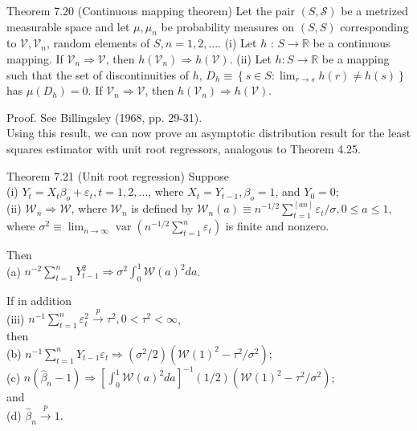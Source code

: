 \documentclass[10pt]{article}
\begin{document}
Theorem 7.20 (Continuous mapping theorem) Let the pair $(S, \mathcal{S})$ be a metrized measurable space and let $\mu, \mu_{n}$ be probability measures on $(S, S)$ corresponding to $\mathcal{V}, \mathcal{V}_{n}$, random elements of $S, n=1,2, \ldots$. (i) Let $h$ : $S \rightarrow \mathbb{R}$ be a continuous mapping. If $\mathcal{V}_{n} \Rightarrow \mathcal{V}$, then $h\left(\mathcal{V}_{n}\right) \Rightarrow h(\mathcal{V})$. (ii) Let $h: S \rightarrow \mathbb{R}$ be a mapping such that the set of discontinuities of $h$, $D_{h} \equiv\left\{s \in S: \lim _{r \rightarrow s} h(r) \neq h(s)\right\}$ has $\mu\left(D_{h}\right)=0$. If $\mathcal{V}_{n} \Rightarrow \mathcal{V}$, then $h\left(\mathcal{V}_{n}\right) \Rightarrow h(\mathcal{V})$.

Proof. See Billingsley (1968, pp. 29-31).\\
Using this result, we can now prove an asymptotic distribution result for the least squares estimator with unit root regressors, analogous to Theorem 4.25.

Theorem 7.21 (Unit root regression) Suppose\\
(i) $Y_{t}=X_{t} \beta_{o}+\varepsilon_{t}, t=1,2, \ldots$, where $X_{t}=Y_{t-1}, \beta_{o}=1$, and $Y_{0}=0$;\\
(ii) $\mathcal{W}_{n} \Rightarrow \mathcal{W}$, where $\mathcal{W}_{n}$ is defined by $\mathcal{W}_{n}(a) \equiv n^{-1 / 2} \sum_{t=1}^{[a n]} \varepsilon_{t} / \sigma, 0 \leq a \leq 1$, where $\sigma^{2} \equiv \lim _{n \rightarrow \infty} \operatorname{var}\left(n^{-1 / 2} \sum_{t=1}^{n} \varepsilon_{t}\right)$ is finite and nonzero.

Then\\
(a) $n^{-2} \sum_{t=1}^{n} Y_{t-1}^{2} \Rightarrow \sigma^{2} \int_{0}^{1} \mathcal{W}(a)^{2} d a$.

If in addition\\
(iii) $n^{-1} \sum_{t=1}^{n} \varepsilon_{t}^{2} \xrightarrow{p} \tau^{2}, 0<\tau^{2}<\infty$,\\
then\\
(b) $n^{-1} \sum_{t=1}^{n} Y_{t-1} \varepsilon_{t} \Rightarrow\left(\sigma^{2} / 2\right)\left(\mathcal{W}(1)^{2}-\tau^{2} / \sigma^{2}\right)$;\\
(c) $n\left(\hat{\beta}_{n}-1\right) \Rightarrow\left[\int_{0}^{1} \mathcal{W}(a)^{2} d a\right]^{-1}(1 / 2)\left(\mathcal{W}(1)^{2}-\tau^{2} / \sigma^{2}\right)$;\\
and\\
(d) $\hat{\beta}_{n} \xrightarrow{p} 1$.
\end{document}
